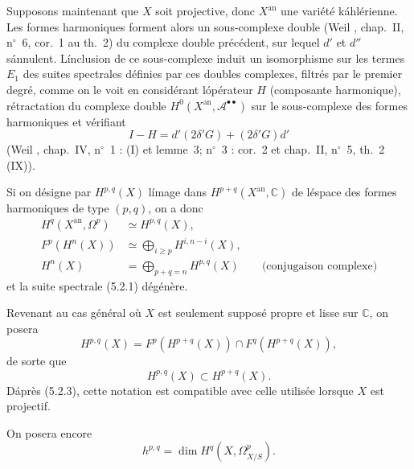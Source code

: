 \documentclass[12pt]{amsart}
\theoremstyle{plain}
\theoremstyle{remark}
\begin{document}
Supposons maintenant que $X$ soit projective, donc $X^{\text{an}}$ une vari\'et\'e k\'ahl\'erienne. Les formes harmoniques forment alors un sous-complexe double (Weil \cite{Weil1}, chap.~II, n${}^\circ$~6, cor.~1 au th.~2) du complexe double pr\'ec\'edent, sur lequel $d'$ et $d''$ s\'annulent. L\'inclusion de ce sous-complexe induit un isomorphisme sur les termes $E_1$ des suites spectrales d\'efinies par ces doubles complexes, filtr\'es par le premier degr\'e, comme on le voit en consid\'erant l\'op\'erateur $H$ (composante harmonique), r\'etractation du complexe double $H^0(X^{\text{an}}, \mathscr{A}^{\bullet\bullet})$ sur le sous-complexe des formes harmoniques et v\'erifiant
\[
I - H = d'(2\delta' G) + (2\delta' G)d'
\]
(Weil \cite{Weil1}, chap.~IV, n${}^\circ$~1 : (I) et lemme~3; n${}^\circ$~3 : cor.~2 et chap.~II, n${}^\circ$~5, th.~2 (IX)).

Si on d\'esigne par $H^{p,q}(X)$ l\'image dans $H^{p+q}(X^{\text{an}}, \mathbb{C})$ de l\'espace des formes harmoniques de type $(p, q)$, on a donc
\begin{align}
H^q(X^{\text{an}}, \Omega^p) &\simeq H^{p,q}(X), \label{eq:5.2.2} \\
F^p(H^n(X)) &\simeq \bigoplus_{i \geq p} H^{i,n-i}(X), \label{eq:5.2.3} \\
H^n(X) &= \bigoplus_{p+q=n} H^{p,q}(X) \qquad \text{(conjugaison complexe)} \label{eq:5.2.4}
\end{align}
et la suite spectrale (5.2.1) d\'eg\'en\`ere.

Revenant au cas g\'en\'eral o\`u $X$ est seulement suppos\'e propre et lisse sur $\mathbb{C}$, on posera
\begin{equation}\label{eq:5.2.5}
H^{p,q}(X) = F^p(H^{p+q}(X)) \cap F^q(H^{p+q}(X)),
\end{equation}
de sorte que
\begin{equation}\label{eq:5.2.6}
H^{p,q}(X) \subset H^{p+q}(X).
\end{equation}
D\'apr\`es (5.2.3), cette notation est compatible avec celle utilis\'ee lorsque $X$ est projectif.

On posera encore
\begin{equation}\label{eq:5.2.7}
h^{p,q} = \dim H^q(X, \Omega_{X/S}^p).
\end{equation}
\end{document}
